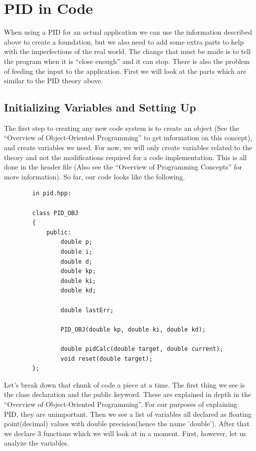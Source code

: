 \documentclass[12pt]{report}
\begin{document}
\newpage
\section{PID in Code}
    When using a PID for an actual application we can use the information described above to create a foundation, but we also need to add some extra parts to help with the imperfections of the real world.
    The change that must be made is to tell the program when it is ``close enough'' and it can stop.
    There is also the problem of feeding the input to the application. 
    First we will look at the parts which are similar to the PID theory above.

\subsection{Initializing Variables and Setting Up}
    The first step to creating any new code system is to create an object (See the ``Overview of Object-Oriented Programming'' to get information on this concept), 
        and create variables we need. 
        For now, we will only create variables related to the theory and not the modifications required for a code implementation. 
        This is all done in the header file (Also see the ``Overview of Programming Concepts'' for more information). So far, our code looks like the following.

    \begin{verbatim}
        in pid.hpp:

        class PID_OBJ
        {
            public:
                double p;
                double i;
                double d;
                double kp;
                double ki;
                double kd;

                double lastErr;

                PID_OBJ(double kp, double ki, double kd);

                double pidCalc(double target, double current);
                void reset(double target);
        };
    \end{verbatim}

    Let's break down that chunk of code a piece at a time. 
    The first thing we see is the class declaration and the public keyword. 
    These are explained in depth in the ``Overview of Object-Oriented Programming''.
    For our purposes of explaining PID, they are unimportant. 
    Then we see a list of variables all declared as floating point(decimal) values with double precision(hence the name 'double').
    After that we declare 3 functions which we will look at in a moment. 
    First, however, let us analyze the variables.
\end{document}

